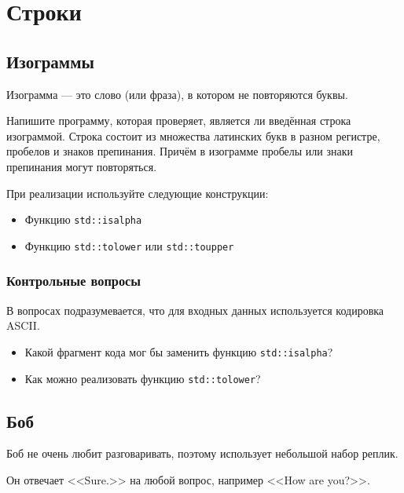 \documentclass[10pt,twoside,openany]{book}
\begin{document}



\tableofcontents

\clearpage


\chapter{Строки}

\section{Изограммы}

Изограмма --- это слово (или фраза), в котором не повторяются буквы.

Напишите программу, которая проверяет, является ли введённая строка изограммой.
Строка состоит из множества латинских букв в разном регистре, пробелов и знаков препинания.
Причём в изограмме пробелы или знаки препинания могут повторяться.

При реализации используйте следующие конструкции:
\begin{itemize}
    \item Функцию {\tt std::isalpha}
    \item Функцию {\tt std::tolower} или {\tt std::toupper}
\end{itemize}

\subsection*{Контрольные вопросы}

В вопросах подразумевается, что для входных данных используется кодировка ASCII.

\begin{itemize}
    \item Какой фрагмент кода мог бы заменить функцию {\tt std::isalpha}?
    \item Как можно реализовать функцию {\tt std::tolower}?
\end{itemize}

\section{Боб}

Боб не очень любит разговаривать, поэтому использует небольшой набор реплик.

Он отвечает <<Sure.>> на любой вопрос, например <<How are you?>>.
\end{document}
